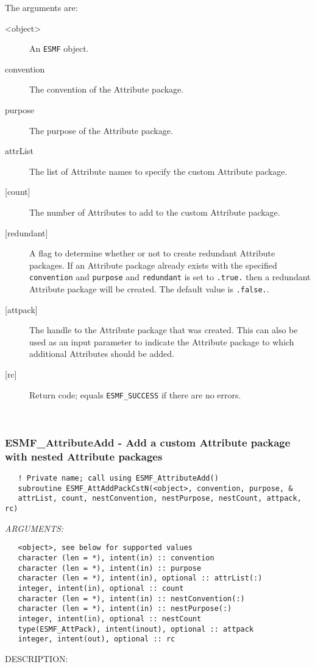    The arguments are:
   \begin{description}
   \item [<object>]
   An {\tt ESMF} object.
   \item [convention]
   The convention of the Attribute package.
   \item [purpose]
   The purpose of the Attribute package.
   \item [attrList]
   The list of Attribute names to specify the custom Attribute package.
   \item [{[count]}]
   The number of Attributes to add to the custom Attribute package.
   \item [{[redundant]}]
   A flag to determine whether or not to create redundant Attribute
   packages. If an Attribute package already exists with the specified
   {\tt convention} and {\tt purpose} and {\tt redundant} is set to
   {\tt .true.} then a redundant Attribute package will be created.
   The default value is {\tt .false.}.
   \item [{[attpack]}]
   The handle to the Attribute package that was created.
   This can also be used as an input parameter to indicate the
   Attribute package to which additional Attributes should be added.
   \item [{[rc]}]
   Return code; equals {\tt ESMF\_SUCCESS} if there are no errors.
   \end{description}
  
   
 
\mbox{}\hrulefill\ 
 
\subsubsection [ESMF\_AttributeAdd] {ESMF\_AttributeAdd - Add a custom Attribute package with nested Attribute packages}


  
\begin{verbatim}   ! Private name; call using ESMF_AttributeAdd()
   subroutine ESMF_AttAddPackCstN(<object>, convention, purpose, &
   attrList, count, nestConvention, nestPurpose, nestCount, attpack, rc)\end{verbatim}{\em ARGUMENTS:}
\begin{verbatim}   <object>, see below for supported values
   character (len = *), intent(in) :: convention
   character (len = *), intent(in) :: purpose
   character (len = *), intent(in), optional :: attrList(:)
   integer, intent(in), optional :: count
   character (len = *), intent(in) :: nestConvention(:)
   character (len = *), intent(in) :: nestPurpose(:)
   integer, intent(in), optional :: nestCount
   type(ESMF_AttPack), intent(inout), optional :: attpack
   integer, intent(out), optional :: rc\end{verbatim}
{\sf DESCRIPTION:\\ }


